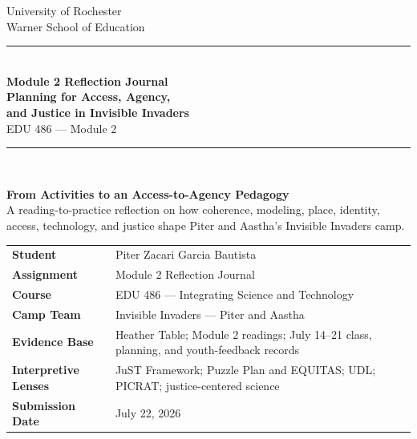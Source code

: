 \documentclass[11pt,letterpaper]{article}
\begin{document}
\hypersetup{pageanchor=false}
\begin{titlepage}
\thispagestyle{empty}

\begin{center}
{\large University of Rochester\\}
{\normalsize Warner School of Education\\[0.15in]}

{\color{PrimaryRed}\rule{\textwidth}{1.4pt}}\\[0.12in]
{\Huge\bfseries Module 2 Reflection Journal\\[0.08in]
\huge Planning for Access, Agency,\\[0.08in]
and Justice in Invisible Invaders}\\[0.18in]
{\Large EDU 486 --- Module 2}\\[0.12in]

\vfill

{\color{PrimaryRed}\rule{0.78\textwidth}{0.7pt}}\\[0.22in]

\colorbox{SoftBlue}{%
\parbox{0.88\textwidth}{%
\centering\small\vspace{0.02in}
\textbf{From Activities to an Access-to-Agency Pedagogy}\\[0.05in]
A reading-to-practice reflection on how coherence, modeling, place, identity, access, technology, and justice shape Piter and Aastha's Invisible Invaders camp.
}%
}
\end{center}

\vfill

\begin{center}
\renewcommand{\arraystretch}{1.18}
\setlength{\tabcolsep}{4pt}
\begin{tabular}{>{\bfseries\RaggedLeft}p{1.55in} p{4.95in}}
Student & Piter Zacari Garcia Bautista \\
Assignment & Module 2 Reflection Journal \\
Course & EDU 486 --- Integrating Science and Technology \\
Camp Team & Invisible Invaders --- Piter and Aastha \\
Evidence Base & Heather Table; Module 2 readings; July 14--21 class, planning, and youth-feedback records \\
Interpretive Lenses & JuST Framework; Puzzle Plan and EQUITAS; UDL; PICRAT; justice-centered science \\
Submission Date & July 22, 2026 \\
\end{tabular}
\end{center}


\end{titlepage}
\end{document}
